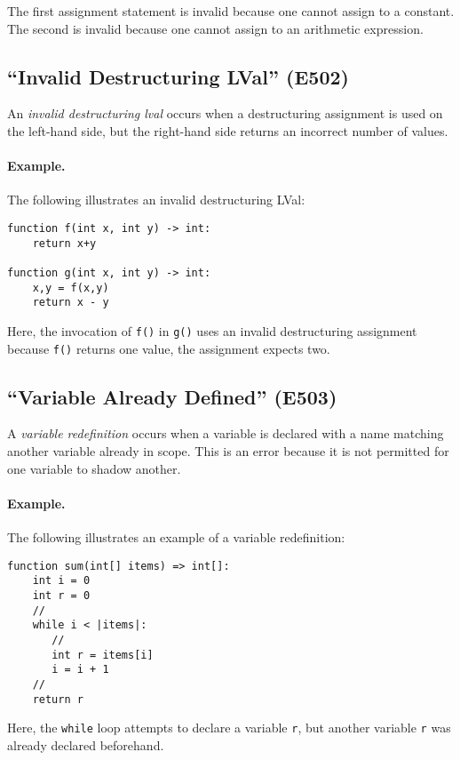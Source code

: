The first assignment statement is invalid because one cannot assign to a constant.  The second is invalid because one cannot assign to an arithmetic expression.

\subsection{``Invalid Destructuring LVal'' (E502)}

An {\em invalid destructuring lval} occurs when a destructuring assignment is used on the left-hand side, but the right-hand side returns an incorrect number of values.

\paragraph{Example.}  The following illustrates an invalid destructuring LVal:

\begin{lstlisting}
function f(int x, int y) -> int:
    return x+y

function g(int x, int y) -> int:
    x,y = f(x,y)
    return x - y
\end{lstlisting}

Here, the invocation of \lstinline{f()} in \lstinline{g()} uses an invalid destructuring assignment because \lstinline{f()} returns one value, the assignment expects two.

\subsection{``Variable Already Defined'' (E503)}

A {\em variable redefinition} occurs when a variable is declared with a name matching another variable already in scope.  This is an error because it is not permitted for one variable to shadow another.

\paragraph{Example.}  The following illustrates an example of a variable redefinition:

\begin{lstlisting}
function sum(int[] items) => int[]:
    int i = 0
    int r = 0
    //
    while i < |items|:
       //
       int r = items[i]
       i = i + 1
    //
    return r
\end{lstlisting}

Here, the \lstinline{while} loop attempts to declare a variable \lstinline{r}, but another variable \lstinline{r} was already declared beforehand.

